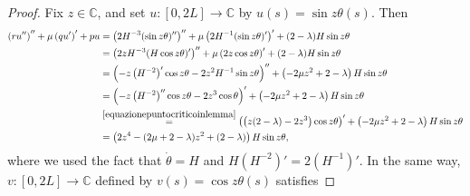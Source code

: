 \documentclass[10pt,a4paper]{amsart}
\begin{document}
\begin{proof}
Fix $z\in\mathbb C$, and set $u:[0,2L]\to\mathbb C$ by $u(s)=\sin z\theta(s)$. Then
\begin{equation*}
\begin{split}
	\left(r  u''\right)''+ \mu\left(q  u'\right)' + pu&= \left(2 H^{-3} (\sin z\theta)''\right)''+ \mu\left(2H^{-1} (\sin z\theta)'\right)' + (2-\lambda)H\sin z\theta\\
	&=\left(2z H^{-3} (H\cos z \theta)'\right)''+ \mu\left(2 z \cos z \theta\right)' + (2-\lambda)H\sin z \theta\\
	&=\left(- z \left( H^{-2}\right)' \cos z \theta-2  z ^2H^{-1}\sin z \theta\right)''+\left(-2\mu z^2+2-\lambda\right)H\sin z\theta\\
	&=\left(-z\left( H^{-2}\right)'' \cos z\theta-2z^3\cos\theta\right)'+\left(-2\mu z^2+2-\lambda\right)H\sin z\theta\\
	&\overset{\eqref{equazionepuntocriticoinlemma}}{=} \left(\left(z(2-\lambda)-2z^3\right)\cos z\theta\right)'+\left(-2\mu z^2+2-\lambda\right)H\sin z\theta\\
	&=\left(2z^4-(2\mu+2-\lambda)z^2+(2-\lambda)\right)H\sin z\theta,\\
\end{split}
\end{equation*}
where we used the fact that $\dot\theta=H$ and $H (H^{-2})'=2(H^{-1})'$. In the same way, $v:[0,2L]\to\mathbb C$ defined by $v(s)=\cos z\theta (s)$ satisfies

\end{proof}
\end{document}
